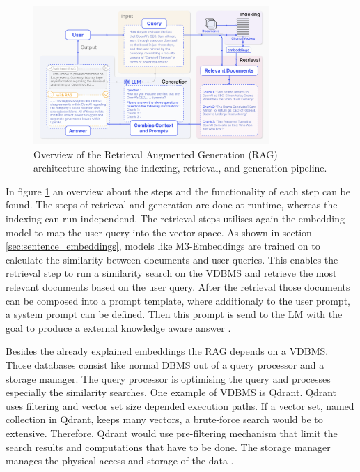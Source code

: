 \documentclass[a4paper,oneside,bibliography=totoc]{scrbook}
\begin{document}
\begin{figure}[t]
  \centering
  \includegraphics[width=0.8\textwidth]{figures/RAG.png}
  \caption{Overview of the Retrieval Augmented Generation (RAG) architecture showing the indexing, retrieval, and generation pipeline. \cite{Gao2024}}
  \label{fig:rag}
\end{figure}

In figure \ref{fig:rag} an overview about the steps and the functionality of each step can be found. The steps of retrieval and generation are done at runtime, whereas the indexing can run independend. The retrieval steps utilises again the embedding model to map the user query into the vector space. As shown in section \ref{sec:sentence_embeddings}, models like M3-Embeddings are trained on to calculate the similarity between documents and user queries. This enables the retrieval step to run a similarity search on the \ac{VDBMS} and retrieve the most relevant documents based on the user query. After the retrieval those documents can be composed into a prompt template, where additionaly to the user prompt, a system prompt can be defined. Then this prompt is send to the \ac{LM} with the goal to produce a external knowledge aware answer \cite{Gao2024}.

Besides the already explained embeddings the \ac{RAG} depends on a \ac{VDBMS}. Those databases consist like normal \ac{DBMS} out of a query processor and a storage manager. The query processor is optimising the query and processes especially the similarity searches. One example of \ac{VDBMS} is Qdrant. Qdrant uses filtering and vector set size depended execution paths. If a vector set, named collection in Qdrant, keeps many vectors, a brute-force search would be to extensive. Therefore, Qdrant would use pre-filtering mechanism that limit the search results and computations that have to be done. The storage manager manages the physical access and storage of the data \cite{Pan2024}.
\end{document}
